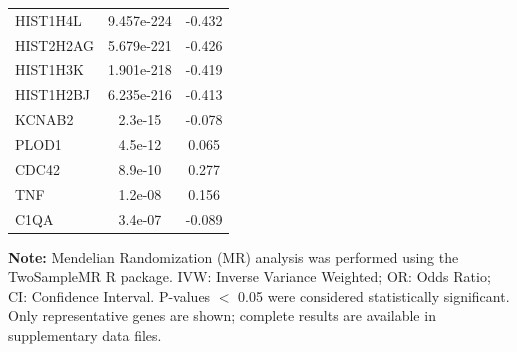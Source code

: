 \documentclass[a4paper,12pt]{article}
\begin{document}
{\begin{longtable}{lcc}
    HIST1H4L   & 9.457e-224 & -0.432                                                                                        \\
    HIST2H2AG  & 5.679e-221 & -0.426                                                                                        \\
    HIST1H3K   & 1.901e-218 & -0.419                                                                                        \\
    HIST1H2BJ  & 6.235e-216 & -0.413                                                                                        \\
    KCNAB2     & 2.3e-15    & -0.078                                                                                        \\
    PLOD1      & 4.5e-12    & 0.065                                                                                         \\
    CDC42      & 8.9e-10    & 0.277                                                                                         \\
    TNF        & 1.2e-08    & 0.156                                                                                         \\
    C1QA       & 3.4e-07    & -0.089                                                                                        \\
  \end{longtable}
}

\vspace{1em}
\noindent\small \textbf{Note:} Mendelian Randomization (MR) analysis was performed using the TwoSampleMR R package. IVW: Inverse Variance Weighted; OR: Odds Ratio; CI: Confidence Interval. P-values $<$ 0.05 were considered statistically significant. Only representative genes are shown; complete results are available in supplementary data files.
\end{document}
